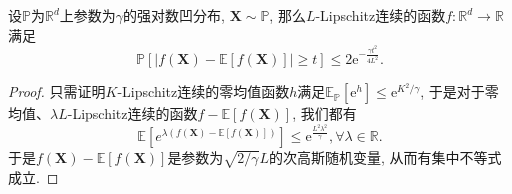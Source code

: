 \begin{theorem}
	设$\mathbb{P}$为$\mathbb{R}^d$上参数为$\gamma$的强对数凹分布, $\bm{X} \sim \mathbb{P}$, 那么$L$-Lipschitz连续的函数$f \colon \mathbb{R}^d \to \mathbb{R}$满足
	\begin{equation*}
		\mathbb{P}[|f(\bm{X}) - \mathbb{E}[f(\bm{X})]| \geq t]
		\leq 2 \mathrm{e}^{- \frac{\gamma t^2}{4 L^2}}.
	\end{equation*}
\end{theorem}
\begin{proof}
	只需证明$K$-Lipschitz连续的零均值函数$h$满足$\mathbb{E}_{\mathbb{P}}[\mathrm{e}^{h}] \leq \mathrm{e}^{K^2 / \gamma}$, 于是对于零均值、$\lambda L$-Lipschitz连续的函数$f - \mathbb{E}[f(\bm{X})]$, 我们都有
	\begin{equation*}
		\mathbb{E}[e^{\lambda(f(\bm{X}) - \mathbb{E}[f(\bm{X})])}] 
		\leq \mathrm{e}^{\frac{L^2 \lambda^2}{\gamma}}, 
		\forall \lambda \in \mathbb{R}.
	\end{equation*}
	于是$f(\bm{X}) - \mathbb{E}[f(\bm{X})]$是参数为$\sqrt{2 / \gamma} L$的次高斯随机变量, 从而有集中不等式成立. 
	

\end{proof}
